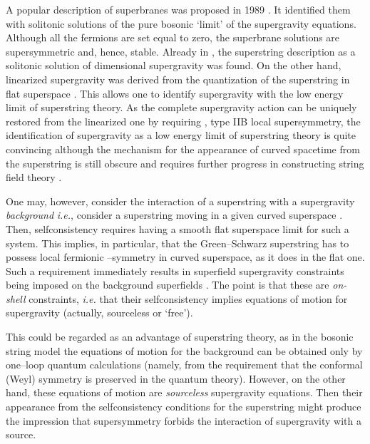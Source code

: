 \documentclass[a4paper,11pt]{article}
\begin{document}
A popular description of superbranes was proposed in 1989 
\cite{DGHR,SUGRA}. It identified them with solitonic 
solutions of the pure bosonic `limit' of the supergravity equations. 
Although all the fermions are set equal to zero, the superbrane solutions are 
supersymmetric and, hence, stable. Already in 
\cite{DGHR}, the superstring description as a solitonic solution of 
\coordHE{} dimensional supergravity was found. 
On the other hand, linearized supergravity was derived from the 
quantization of the superstring in flat superspace \cite{GSW}. This allows 
one to 
identify supergravity with the low energy limit of superstring theory. 
As the complete supergravity action 
can be uniquely restored from the linearized one by  
requiring \coordHE{}, type IIB local supersymmetry, 
the  identification of supergravity as a low energy limit of 
superstring theory is quite convincing although 
the mechanism for the appearance of curved spacetime from the superstring 
is still obscure and requires further progress in constructing string 
field theory \cite{StrF}. 

One may, however, consider the interaction of a superstring with a 
supergravity {\sl background} {\it i.e.}, consider a superstring moving 
in a given curved superspace \cite{strKsg}.  
Then, selfconsistency requires having a smooth flat superspace limit 
for such a system. This implies, in particular, that 
the Green--Schwarz superstring has to  possess local fermionic 
\myHighlight{$\kappa$}\coordHE{}--symmetry \cite{ALS,GSW} in curved superspace, as it does in the flat 
one. Such a requirement immediately results in \coordHE{} superfield supergravity 
constraints being imposed on the background superfields \cite{strKsg}. 
The point is that these are {\sl on-shell} constraints, {\it i.e.} 
that their selfconsistency implies equations of motion for 
\coordHE{} supergravity (actually, sourceless or `free').  

  
This could be regarded as an advantage of superstring theory, as in the 
bosonic string model the equations of motion for the background can be 
obtained only by one--loop quantum calculations (namely, from the requirement 
that the conformal (Weyl) symmetry is preserved in the quantum theory). 
However, on the other hand, these equations of motion are {\sl sourceless}  
supergravity equations. Then  their appearance from the selfconsistency 
conditions  for the superstring might produce the impression that 
supersymmetry forbids the interaction of supergravity with a source. 
\end{document}
